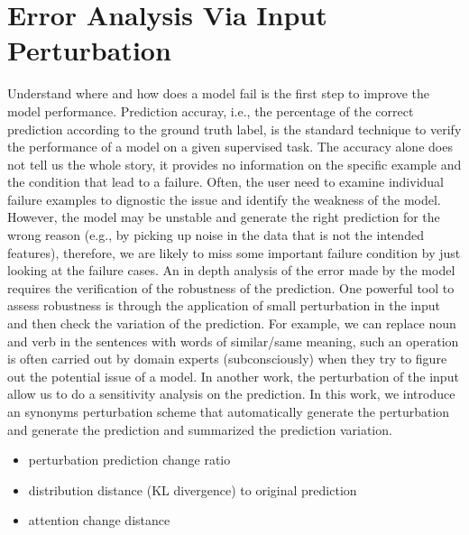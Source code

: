 \section{Error Analysis Via Input Perturbation}



Understand where and how does a model fail is the first step to improve the
model performance.
Prediction accuray, i.e., the percentage of the correct prediction according to
the ground truth label, is the standard technique to verify the performance
of a model on a given supervised task.
%
The accuracy alone does not tell us the whole story, it provides no
information on the specific example and the condition that lead to a failure.
%
Often, the user need to examine individual failure examples to dignostic the
issue and identify the weakness of the model.
%
However, the model may be unstable and generate the right prediction for the wrong
reason (e.g., by picking up noise in the data that is not the intended features),
therefore, we are likely to miss some important failure condition by just looking
at the failure cases.
%
An in depth analysis of the error made by the model requires the verification of
the robustness of the prediction.
%
One powerful tool to assess robustness is through the application of small
perturbation in the input and then check the variation of the prediction.
%
For example, we can replace noun and verb in the sentences with words of
similar/same meaning, such an operation is often carried out by domain experts
(subconsciously) when they try to figure out the potential issue of a model.
%
In another work, the perturbation of the input allow us to do a sensitivity
analysis on the prediction.
%
In this work, we introduce an synonyms perturbation scheme that automatically
generate the perturbation and generate the prediction and summarized the prediction
variation.
%


\begin{itemize}
    \item perturbation prediction change ratio
    \item distribution distance (KL divergence) to original prediction
    \item attention change distance
\end{itemize}


